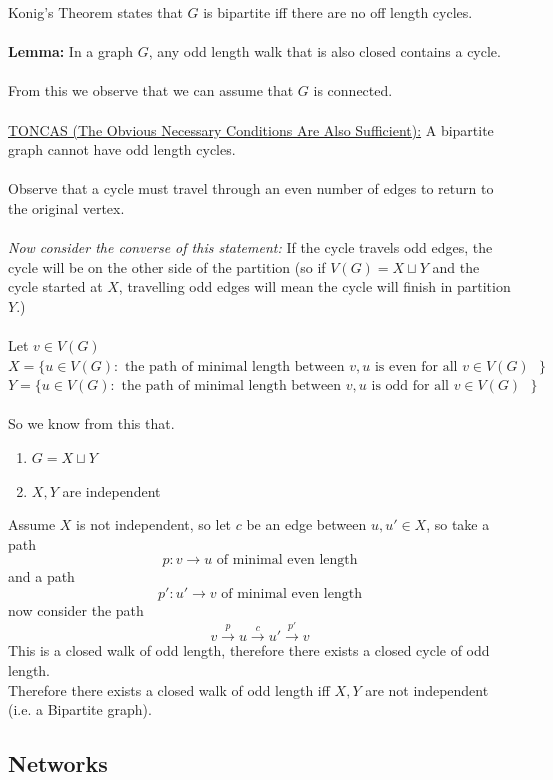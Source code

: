 \documentclass[12pt]{article}
\begin{document}
Konig's Theorem states that $G$ is bipartite iff there are no off length cycles.\\
\\
\textbf{Lemma:} In a graph $G$, any odd length walk that is also closed contains a cycle.\\
\\
From this we observe that we can assume that $G$ is connected.\\
\\
\underline{TONCAS (The Obvious Necessary Conditions Are Also Sufficient):} A bipartite graph cannot have odd length cycles.\\
\\
Observe that a cycle must travel through an even number of edges to return to the original vertex.\\
\\
\textit{Now consider the converse of this statement:} If the cycle travels odd edges, the cycle will be on the other side of the partition (so if $V(G) = X \sqcup Y$ and the cycle started at $X$, travelling odd edges will mean the cycle will finish in partition $Y$.)\\
\\
Let $v \in V(G)$\\
$X = \{ u \in V(G) : \text{ the path of minimal length between $v,u$ is even for all $v\in V(G)$ } \}$\\
$Y = \{ u \in V(G) : \text{ the path of minimal length between $v,u$ is odd for all $v\in V(G)$ } \}$
\\
\\
So we know from this that.
\begin{enumerate}
	\item{$G = X \sqcup Y $}
	\item{$X,Y$ are independent}
\end{enumerate}

Assume $X$ is not independent, so let $c$ be an edge between $u, u' \in X$, so take a path $$p: v \rightarrow u \text{ of minimal even length}$$ and a path $$p': u' \rightarrow v \text{ of minimal even length}$$
now consider the path $$v\overset{p}{\rightarrow} u \overset{c}{\rightarrow} u' \overset{p'}{\rightarrow} v$$
This is a closed walk of odd length, therefore there exists a closed cycle of odd length.\\
Therefore there exists a closed walk of odd length iff $X,Y$ are not independent (i.e. a Bipartite graph).

\subsection{Networks}
\end{document}
